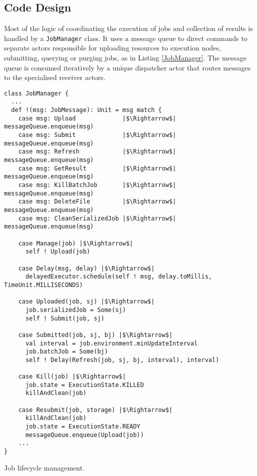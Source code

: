 \subsection{Code Design}

Most of the logic of coordinating the execution of jobs and collection of results is handled by a \verb|JobManager| class. It uses a message queue to direct commands to separate actors responsible for uploading resources to execution nodes, submitting, querying or purging jobs, as in Listing \ref{JobManager}. The message queue is consumed iteratively by a unique dispatcher actor that routes messages to the specialised receiver actors.

\begin{listing}[h]
	\centering
	\begin{minipage}{13.8cm}
		\begin{verbatim}
class JobManager {
  ...
  def !(msg: JobMessage): Unit = msg match {
    case msg: Upload             |$\Rightarrow$| messageQueue.enqueue(msg)
    case msg: Submit             |$\Rightarrow$| messageQueue.enqueue(msg)
    case msg: Refresh            |$\Rightarrow$| messageQueue.enqueue(msg)
    case msg: GetResult          |$\Rightarrow$| messageQueue.enqueue(msg)
    case msg: KillBatchJob       |$\Rightarrow$| messageQueue.enqueue(msg)
    case msg: DeleteFile         |$\Rightarrow$| messageQueue.enqueue(msg)
    case msg: CleanSerializedJob |$\Rightarrow$| messageQueue.enqueue(msg)
    
    case Manage(job) |$\Rightarrow$|
      self ! Upload(job)
      
    case Delay(msg, delay) |$\Rightarrow$|
      delayedExecutor.schedule(self ! msg, delay.toMillis, TimeUnit.MILLISECONDS)
      
    case Uploaded(job, sj) |$\Rightarrow$|
      job.serializedJob = Some(sj)
      self ! Submit(job, sj)
      
    case Submitted(job, sj, bj) |$\Rightarrow$|
      val interval = job.environment.minUpdateInterval
      job.batchJob = Some(bj)
      self ! Delay(Refresh(job, sj, bj, interval), interval)
      
    case Kill(job) |$\Rightarrow$|
      job.state = ExecutionState.KILLED
      killAndClean(job)
      
    case Resubmit(job, storage) |$\Rightarrow$|
      killAndClean(job)
      job.state = ExecutionState.READY
      messageQueue.enqueue(Upload(job))      
    ...
}
		\end{verbatim}
	\end{minipage}
	\caption{Job lifecycle management.}
	\label{JobManager}
\end{listing}

